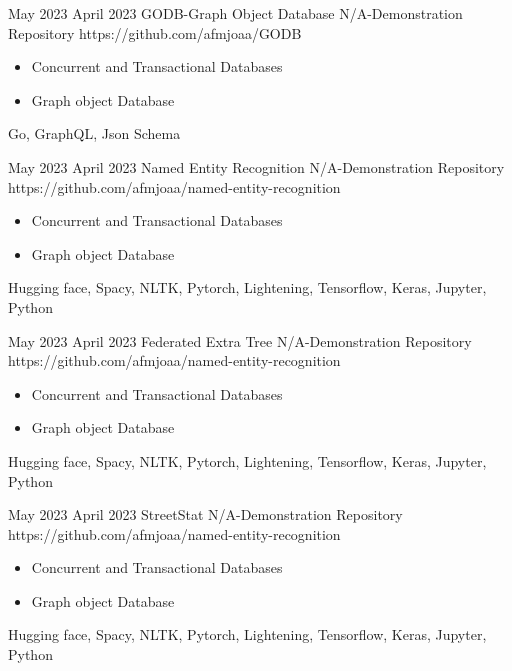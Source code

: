 
\horizontalLine
\begin{universalList}
  \universalListItem
    {May 2023}
    {April 2023}
    {GODB-Graph Object Database}
    {N/A-Demonstration}
    {Repository}
    {https://github.com/afmjoaa/GODB}
    {
      \begin{itemize}
        \item Concurrent and Transactional Databases
        \item Graph object Database
      \end{itemize}
    }
    {Go, GraphQL, Json Schema}

  \emptySeparator
  \universalListItem
    {May 2023}
    {April 2023}
    {Named Entity Recognition}
    {N/A-Demonstration}
    {Repository}
    {https://github.com/afmjoaa/named-entity-recognition}
    {
      \begin{itemize}
        \item Concurrent and Transactional Databases
        \item Graph object Database
      \end{itemize}
    }
    {Hugging face, Spacy, NLTK, Pytorch, Lightening, Tensorflow, Keras, Jupyter, Python}

  \emptySeparator
  \universalListItem
    {May 2023}
    {April 2023}
    {Federated Extra Tree}
    {N/A-Demonstration}
    {Repository}
    {https://github.com/afmjoaa/named-entity-recognition}
    {
      \begin{itemize}
        \item Concurrent and Transactional Databases
        \item Graph object Database
      \end{itemize}
    }
    {Hugging face, Spacy, NLTK, Pytorch, Lightening, Tensorflow, Keras, Jupyter, Python}

  \emptySeparator
  \universalListItem
    {May 2023}
    {April 2023}
    {StreetStat}
    {N/A-Demonstration}
    {Repository}
    {https://github.com/afmjoaa/named-entity-recognition}
    {
      \begin{itemize}
        \item Concurrent and Transactional Databases
        \item Graph object Database
      \end{itemize}
    }
    {Hugging face, Spacy, NLTK, Pytorch, Lightening, Tensorflow, Keras, Jupyter, Python}


\end{universalList}

